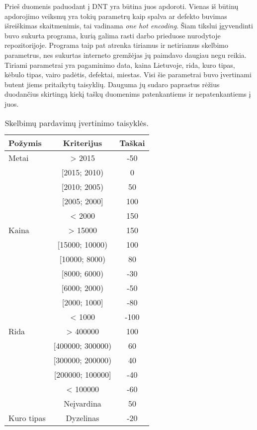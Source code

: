 \documentclass{VUMIFPSkursinis}
\begin{document}
Prieš duomenis paduodant į DNT yra būtina juos apdoroti. Vienas iš būtinų apdorojimo veiksmų yra tokių parametrų kaip spalva ar defekto buvimas išreiškimas skaitmenimis, tai vadinama \textit{one hot encoding}. Šiam tikslui įgyvendinti buvo sukurta programa, kurią galima rasti darbo prieduose nurodytoje repozitorijoje. Programa taip pat atrenka tiriamus ir netiriamus skelbimo parametrus, nes sukurtas interneto gremžėjas jų paimdavo daugiau negu reikia. Tiriami parametrai yra pagaminimo data, kaina Lietuvoje, rida, kuro tipas, kėbulo tipas, vairo padėtis, defektai, miestas. Visi šie parametrai buvo įvertinami butent jiems pritaikytų taisyklių. Dauguma jų sudaro paprastus rėžius duodančius skirtingą kiekį taškų duomenims patenkantiems ir nepatenkantiems į juos.

\begin{table}[H]\footnotesize
  \centering
  \caption{Skelbimų pardavimų įvertinimo taisyklės.}
  {\begin{tabular}{|l|c|c|} \hline
    Požymis & Kriterijus & Taškai \\
    \hline
    Metai & > 2015         & -50       \\
         & [2015; 2010)   & 0      \\
         & [2010; 2005)   & 50      \\
         & [2005; 2000]   & 100      \\
         & < 2000   & 150      \\
    \hline
    Kaina & > 15000         & 150\\
        & [15000; 10000)   & 100      \\
        & [10000; 8000)   & 80      \\
        & [8000; 6000)   & -30      \\
        & [6000; 2000)   & -50     \\
        & [2000; 1000]   & -80     \\
        & < 1000   & -100     \\
    \hline
    Rida & > 400000         & 100\\
        & [400000; 300000)   & 60      \\
        & [300000; 200000)   & 40      \\
        & [200000; 100000]   & -40      \\
        & < 100000   & -60     \\
        & Neįvardina   & 50     \\
    \hline
    Kuro tipas & Dyzelinas   & -20\\

\end{tabular}}
\end{table}
\end{document}
